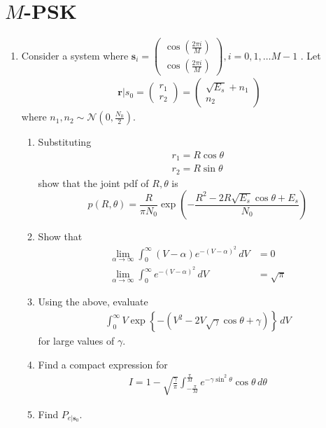 \documentclass[journal,10pt,twocolumn]{IEEEtran}
\providecommand{\brak}[1]{\ensuremath{\left(#1\right)}}
\providecommand{\cbrak}[1]{\ensuremath{\left\{#1\right\}}}
\newcommand{\myvec}[1]{\ensuremath{\begin{pmatrix}#1\end{pmatrix}}}
\begin{document}
\section{$M$-PSK}
\begin{enumerate}

\item
Consider a system where 
$\mathbf{s}_i=
\myvec{
\cos\brak{\frac{2\pi i}{M}}\\
\cos\brak{\frac{2\pi i}{M}}
}, i = 0, 1 , \dots M-1
$
.
Let
%
\begin{align}
\mathbf{r}|s_0 = 
\myvec{
r_1\\
r_2
}
=
\myvec{
\sqrt{E_s}+n_1\\
n_2
}
\end{align}
where $n_1,n_2 \sim \mathcal{N}\brak{0,\frac{N_0}{2}}$.

\begin{enumerate}[label=(\alph{enumii})]
\item Substituting 
\begin{align}
r_1=R\cos \theta \\
r_2=R\sin \theta
\end{align}
show that the joint pdf of $R,\theta$ is
%
\begin{equation}
p\brak{R,\theta}=\frac{R}{\pi N_0}\exp\brak{-\frac{R^2-2R\sqrt{E_s}\cos \theta + E_s}{N_0}}
\end{equation}
%
\item Show that 
%
\begin{align}
\lim_{\alpha \rightarrow \infty}\int_{0}^{\infty}\brak{V-\alpha }e^{-\brak{V-\alpha}^2 }\,dV
&= 0
\\
\lim_{\alpha \rightarrow \infty}\int_{0}^{\infty} e^{-\brak{V-\alpha}^2 }\,dV
&=  \sqrt{\pi}
\end{align}
%
\item 
Using the above, evaluate
%
\begin{align}
\int_{0}^{\infty}V\exp\cbrak{-\brak{V^2 - 2V \sqrt{\gamma}\cos \theta +\gamma}}\,dV
\end{align}
%
for large values of $\gamma$.
\item
Find a compact expression for 
%
\begin{align}
I = 1 - \sqrt{\frac{\gamma}{\pi}}\int_{-\frac{\pi}{M}}^{\frac{\pi}{M}}e^{- \gamma\sin^2\theta }\cos \theta\, d\theta
\end{align}
\item Find $P_{e|\mathbf{s}_0}$.
\end{enumerate}
\end{enumerate}
\end{document}
